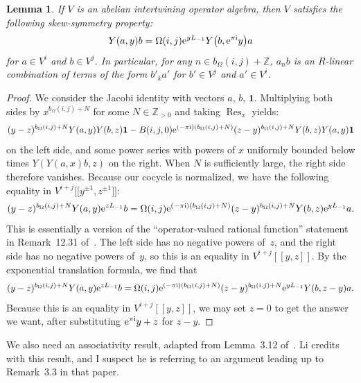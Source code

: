 \documentclass[pdftex]{sigma}
\newcommand{\bZ}{\mathbb{Z}}
\newcommand{\unit}{\mathbf{1}}
\DeclareMathOperator{\Res}{Res}
\newtheorem{lem}[thm]{Lemma}
\theoremstyle{definition}
\begin{document}
\begin{lem} \label{lem:skew-symmetry-for-AIA}If $V$ is an abelian intertwining operator algebra, then $V$ satisfies the following skew-symmetry property:
\begin{gather*} Y(a,y)b = \Omega(i,j){\rm e}^{yL_{-1}}Y\big(b,{\rm e}^{\pi {\rm i}}y\big)a \end{gather*}
for $a \in V^i$ and $b \in V^j$. In particular, for any $n \in b_\Omega(i,j) + \bZ$, $a_n b$ is an $R$-linear combination of terms of the form $b'_k a'$ for $b' \in V^j$ and $a' \in V^i$.
\end{lem}
\begin{proof}We consider the Jacobi identity with vectors $a$, $b$, $\unit$. Multiplying both sides by $x^{b_\Omega(i,j)+N}$ for some $N \in \bZ_{>0}$ and taking $\Res_x$ yields:
\begin{gather*} (y-z)^{b_\Omega(i,j)+N}Y(a,y) Y(b,z) \unit - B(i,j,0) {\rm e}^{(-\pi {\rm i})(b_\Omega(i,j)+N)}(z-y)^{b_\Omega(i,j)+N} Y(b,z) Y(a,y) \unit \end{gather*}
on the left side, and some power series with powers of $x$ uniformly bounded below times $Y(Y(a,x)b,z)$ on the right. When $N$ is sufficiently large, the right side therefore vanishes. Because our cocycle is normalized, we have the following equality in $V^{i+j}\big[\big[y^{\pm 1},z^{\pm 1}\big]\big]$:
\begin{gather*} (y-z)^{b_\Omega(i,j)+N}Y(a,y) {\rm e}^{zL_{-1}}b = \Omega(i,j) {\rm e}^{(-\pi {\rm i})(b_\Omega(i,j)+N)}(z-y)^{b_\Omega(i,j)+N} Y(b,z) {\rm e}^{yL_{-1}}a. \end{gather*}
This is essentially a version of the ``operator-valued rational function'' statement in Remark~12.31 of~\cite{DL93}. The left side has no negative powers of~$z$, and the right side has no negative powers of~$y$, so this is an equality in $V^{i+j}[[y,z]]$. By the exponential translation formula, we find that
\begin{gather*} (y-z)^{b_\Omega(i,j)+N}Y(a,y) {\rm e}^{zL_{-1}}b = \Omega(i,j) {\rm e}^{(-\pi {\rm i})(b_\Omega(i,j)+N)}(z-y)^{b_\Omega(i,j)+N} {\rm e}^{yL_{-1}} Y(b,z-y) a. \end{gather*}
Because this is an equality in $V^{i+j}[[y,z]]$, we may set $z=0$ to get the answer we want, after substituting ${\rm e}^{\pi {\rm i}}y + z$ for $z-y$.
\end{proof}

We also need an associativity result, adapted from Lemma~3.12 of~\cite{L99}. Li credits~\cite{DLM96} with this result, and I suspect he is referring to an argument leading up to Remark~3.3 in that paper.
\end{document}
